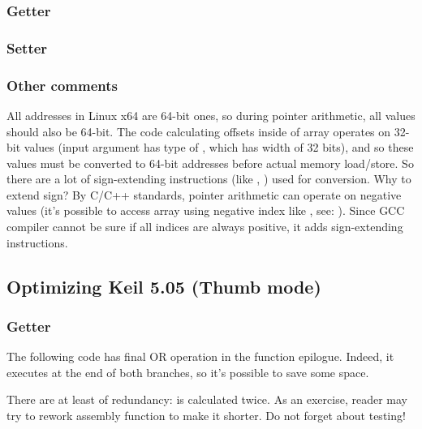\subsubsection{Getter}



\subsubsection{Setter}



\subsubsection{Other comments}

All addresses in Linux x64 are 64-bit ones, so during pointer arithmetic, all values should also be 64-bit.
The code calculating offsets inside of array operates on 32-bit values (input  argument has type of , which has width of 32 bits),
and so these values must be converted to 64-bit addresses before actual memory load/store.
So there are a lot of sign-extending instructions (like , ) used for conversion.
Why to extend sign? By C/C++ standards, pointer arithmetic can operate on negative values 
(it's possible to access array using negative index like , see: ).
Since GCC compiler cannot be sure if all indices are always positive, it adds sign-extending instructions.

\subsection{Optimizing Keil 5.05 (Thumb mode)}

\subsubsection{Getter}

The following code has final OR operation in the function epilogue.
Indeed, it executes at the end of both branches, so it's possible to save some space.



There are at least of redundancy:  is calculated twice.
As an exercise, reader may try to rework assembly function to make it shorter. Do not forget about testing!

